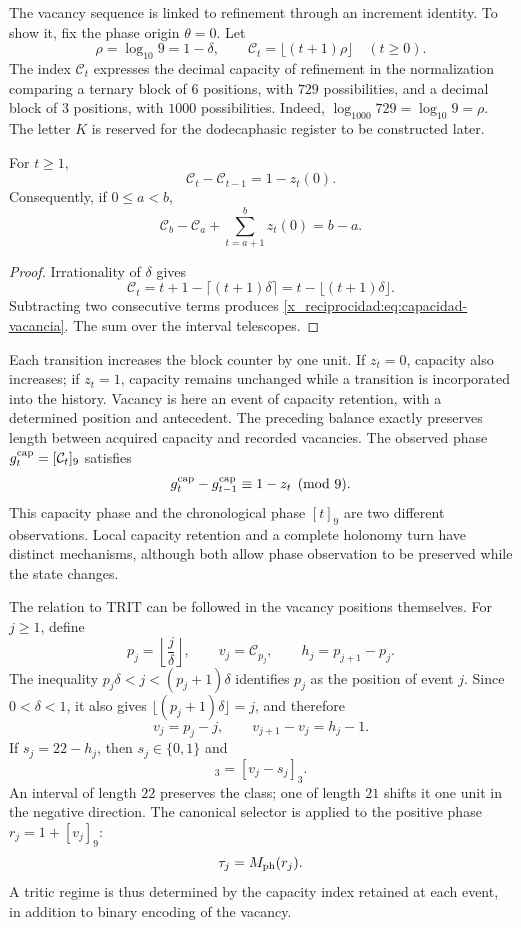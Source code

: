 The vacancy sequence is linked to refinement through an
increment identity. To show it, fix the phase origin
\(\theta=0\). Let
\[
 \rho=\log_{10}9=1-\delta,\qquad
 \mathcal C_t=\lfloor(t+1)\rho\rfloor\quad(t\geq0).
\]
The index \(\mathcal C_t\) expresses the decimal capacity of refinement
in the normalization comparing a ternary block of \(6\) positions,
with \(729\) possibilities, and a decimal block of \(3\) positions, with
\(1000\) possibilities. Indeed,
\(\log_{1000}729=\log_{10}9=\rho\). The letter \(K\) is reserved for
the dodecaphasic register to be constructed later.

\begin{proposition}
\label{x_reciprocidad:prop:capacidad-vacancia}
For \(t\geq1\),
\begin{equation}
 \mathcal C_t-\mathcal C_{t-1}=1-z_t(0).
 \label{x_reciprocidad:eq:capacidad-vacancia}
\end{equation}
Consequently, if \(0\leq a<b\),
\[
 \mathcal C_b-\mathcal C_a+
 \sum_{t=a+1}^{b}z_t(0)=b-a.
\]
\end{proposition}
\begin{proof}
Irrationality of \(\delta\) gives
\[
 \mathcal C_t
 =t+1-\lceil(t+1)\delta\rceil
 =t-\lfloor(t+1)\delta\rfloor.
\]
Subtracting two consecutive terms produces
\eqref{x_reciprocidad:eq:capacidad-vacancia}. The sum over the interval telescopes.
\end{proof}

Each transition increases the block counter by one unit. If
\(z_t=0\), capacity also increases; if \(z_t=1\), capacity
remains unchanged while a transition is incorporated into the history. Vacancy
is here an event of capacity retention, with a determined position and
antecedent. The preceding balance exactly preserves length
between acquired capacity and recorded vacancies. The observed
phase \(g_t^{\rm cap}=[\mathcal C_t]_9\) satisfies
\[
 g_t^{\rm cap}-g_{t-1}^{\rm cap}\equiv1-z_t\pmod9.
\]
This capacity phase and the chronological phase \([t]_9\) are two
different observations. Local capacity retention and a complete
holonomy turn have distinct mechanisms, although both
allow phase observation to be preserved while the state changes.

The relation to TRIT can be followed in the vacancy positions themselves.
For \(j\geq1\), define
\[
 p_j=\left\lfloor\frac j\delta\right\rfloor,\qquad
 v_j=\mathcal C_{p_j},\qquad h_j=p_{j+1}-p_j.
\]
The inequality \(p_j\delta<j<(p_j+1)\delta\) identifies \(p_j\)
as the position of event \(j\). Since \(0<\delta<1\), it also gives
\(\lfloor(p_j+1)\delta\rfloor=j\), and therefore
\[
 v_j=p_j-j,\qquad
 v_{j+1}-v_j=h_j-1.
\]
If \(s_j=22-h_j\), then \(s_j\in\{0,1\}\) and
\begin{equation}
 [v_{j+1}]_3=[v_j-s_j]_3.
 \label{x_reciprocidad:eq:vacancia-regimen}
\end{equation}
An interval of length \(22\) preserves the class; one of length
\(21\) shifts it one unit in the negative direction. The canonical selector
is applied to the positive phase \(r_j=1+[v_j]_9\):
\[
 \tau_j=M_{\rm ph}(r_j).
\]
A tritic regime is thus determined by the capacity index
retained at each event, in addition to binary encoding of the vacancy.

